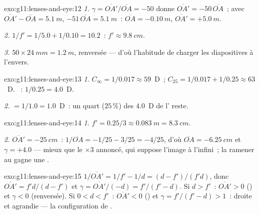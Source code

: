 \begin{solution}{exo:g11:lenses-and-eye:12}
\emph{1.} $\gamma = \overline{OA'}/\overline{OA} = -50$ donne
$\overline{OA'} = -50\,\overline{OA}$~; avec
$\overline{OA'} - \overline{OA} = \qty{5.1}{m}$,
$-51\,\overline{OA} = \qty{5.1}{m}$~: $\overline{OA} = \qty{-0.10}{m}$,
$\overline{OA'} = +\qty{5.0}{m}$.

\emph{2.} $1/f' = 1/5.0 + 1/0.10 = 10.2$~: $f' \approx \qty{9.8}{cm}$.

\emph{3.} $50 \times \qty{24}{mm} = \qty{1.2}{m}$, renversée --- d'où
l'habitude de charger les diapositives à l'envers.
\end{solution}

\begin{solution}{exo:g11:lenses-and-eye:13}
\emph{1.} $C_\infty = 1/0.017 \approx 59$~D~;
$C_{25} = 1/0.017 + 1/0.25 \approx 63$~D.
~: $1/0.25 = 4.0$~D.

\emph{2.}  $= 1/1.0 = 1.0$~D~: un quart
($25\,\%$) des $4.0$~D de l' reste.
\end{solution}

\begin{solution}{exo:g11:lenses-and-eye:14}
\emph{1.} $f' = 0.25/3 \approx \qty{0.083}{m} = \qty{8.3}{cm}$.

\emph{2.} $\overline{OA'} = \qty{-25}{cm}$~:
$1/\overline{OA} = -1/25 - 3/25 = -4/25$, d'où
$\overline{OA} = \qty{-6.25}{cm}$ et $\gamma = +4.0$ --- mieux que le
$\times 3$ annoncé, qui suppose l'image à l'infini~; la ramener au
 gagne une
.
\end{solution}

\begin{solution}{exo:g11:lenses-and-eye:15}
$1/\overline{OA'} = 1/f' - 1/d = (d - f')/(f'd)$, donc
$\overline{OA'} = f'd/(d - f')$ et
$\gamma = \overline{OA'}/(-d) = f'/(f' - d)$. Si $d > f'$~:
$\overline{OA'} > 0$ () et $\gamma < 0$
(renversée). Si $0 < d < f'$~: $\overline{OA'} < 0$
() et
$\gamma = f'/(f' - d) > 1$~: droite et agrandie --- la configuration de
.
\end{solution}

